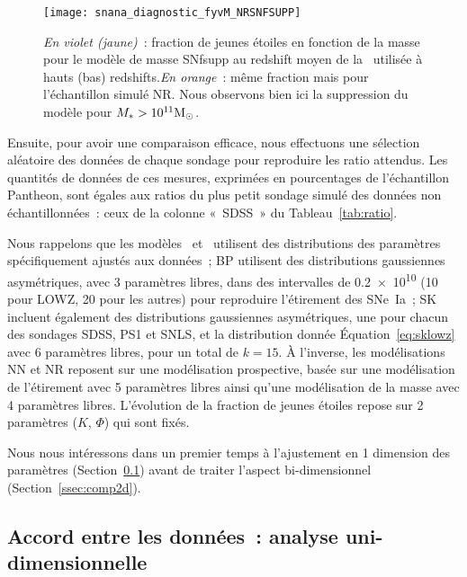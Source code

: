 \documentclass[../main/main.tex]{subfiles}
\begin{document}
\begin{SCfigure}[1][h!]
    \centering
    \texttt{[image: snana\_diagnostic\_fyvM\_NRSNFSUPP]}
    \caption[Fraction de jeunes étoiles en fonction de la masse pour le modèle
    de masse SNfsupp]{\textit{En violet (jaune)}~: fraction de jeunes étoiles en
        fonction de la masse pour le modèle de masse SNfsupp au redshift moyen
        de la \hostlib\ utilisée à hauts (bas) redshifts.\smallbreak \textit{En
        orange}~: même fraction mais pour l'échantillon simulé NR. Nous
        observons bien ici la suppression du modèle pour
    $M_* > 10^{11}\si{\Msun}$.}
    \label{fig:fyvMsupp}
\end{SCfigure}

Ensuite, pour avoir une comparaison efficace, nous effectuons une sélection
aléatoire des données de chaque sondage pour reproduire les ratio attendus. Les
quantités de données de ces mesures, exprimées en pourcentages de l'échantillon
Pantheon, sont égales aux ratios du plus petit sondage simulé des données non
échantillonnées~: ceux de la colonne «~SDSS~» du Tableau~\ref{tab:ratio}.

Nous rappelons que les modèles~
et~ utilisent des distributions des paramètres
spécifiquement ajustés aux données~; BP utilisent des distributions gaussiennes
asymétriques, avec 3 paramètres libres, dans des intervalles de
\SI{0.2e10}{\Msun} (10 pour LOWZ, 20 pour les autres) pour reproduire
l'étirement des SNe~Ia~; SK incluent également des distributions gaussiennes
asymétriques, une pour chacun des sondages SDSS, PS1 et SNLS, et la distribution
donnée Équation~\ref{eq:sklowz} avec 6 paramètres libres, pour un total de $k =
15$. À l'inverse, les modélisations NN et NR reposent sur une modélisation
prospective, basée sur une modélisation de l'étirement avec 5 paramètres libres
ainsi qu'une modélisation de la masse avec 4 paramètres libres. L'évolution de
la fraction de jeunes étoiles repose sur 2 paramètres ($K$, $\Phi$) qui sont
fixés.

Nous nous intéressons dans un premier temps à l'ajustement en 1 dimension des
paramètres (Section~\ref{ssec:comp1d}) avant de traiter l'aspect bi-dimensionnel
(Section~\ref{ssec:comp2d}).

\subsection{Accord entre les données~: analyse uni-dimensionnelle}\label{ssec:comp1d}
\end{document}
